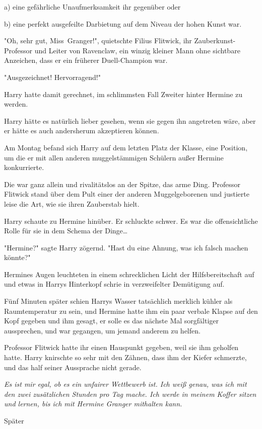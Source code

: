 {a) eine gefährliche Unaufmerksamkeit ihr gegenüber oder

b) eine perfekt ausgefeilte Darbietung auf dem Niveau der hohen Kunst war.

"Oh, sehr gut, Miss~Granger!", quietschte Filius Flitwick, ihr Zauberkunst-Professor und Leiter von Ravenclaw, ein winzig kleiner Mann ohne sichtbare Anzeichen, dass er ein früherer Duell-Champion war.

"Ausgezeichnet! Hervorragend!"

Harry hatte damit gerechnet, im schlimmsten Fall Zweiter hinter Hermine zu werden.

Harry hätte es natürlich lieber gesehen, wenn sie gegen ihn angetreten wäre, aber er hätte es auch andersherum akzeptieren können.

Am Montag befand sich Harry auf dem letzten Platz der Klasse, eine Position, um die er mit allen anderen muggelstämmigen Schülern außer Hermine konkurrierte.

Die war ganz allein und rivalitätslos an der Spitze, das arme Ding. Professor Flitwick stand über dem Pult einer der anderen Muggelgeborenen und justierte leise die Art, wie sie ihren Zauberstab hielt.

Harry schaute zu Hermine hinüber. Er schluckte schwer. Es war die offensichtliche Rolle für sie in dem Schema der Dinge…

"Hermine?" sagte Harry zögernd. "Hast du eine Ahnung, was ich falsch machen könnte?"

Hermines Augen leuchteten in einem schrecklichen Licht der Hilfsbereitschaft auf und etwas in Harrys Hinterkopf schrie in verzweifelter Demütigung auf.

Fünf Minuten später schien Harrys Wasser tatsächlich merklich kühler als Raumtemperatur zu sein, und Hermine hatte ihm ein paar verbale Klapse auf den Kopf gegeben und ihm gesagt, er solle es das nächste Mal sorgfältiger aussprechen, und war gegangen, um jemand anderem zu helfen.

Professor Flitwick hatte ihr einen Hauspunkt gegeben, weil sie ihm geholfen hatte. Harry knirschte so sehr mit den Zähnen, dass ihm der Kiefer schmerzte, und das half seiner Aussprache nicht gerade.

\emph{Es ist mir egal, ob es ein unfairer Wettbewerb ist. Ich weiß genau, was ich mit den zwei zusätzlichen Stunden pro Tag mache. Ich werde in meinem Koffer sitzen und lernen, bis ich mit Hermine Granger mithalten kann.}

Später

}
